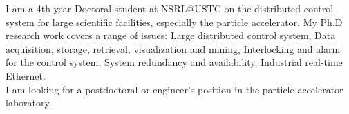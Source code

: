 

I am a 4th-year Doctoral student at NSRL@USTC on the distributed control system for large scientific facilities, especially the particle accelerator. My Ph.D research work covers a range of issues: Large distributed control system, Data acquisition, storage, retrieval,  visualization and mining, Interlocking and alarm for the control system, System redundancy and availability, Industrial real-time Ethernet. \\
I am looking for a postdoctoral or engineer's position in the particle accelerator laboratory.


